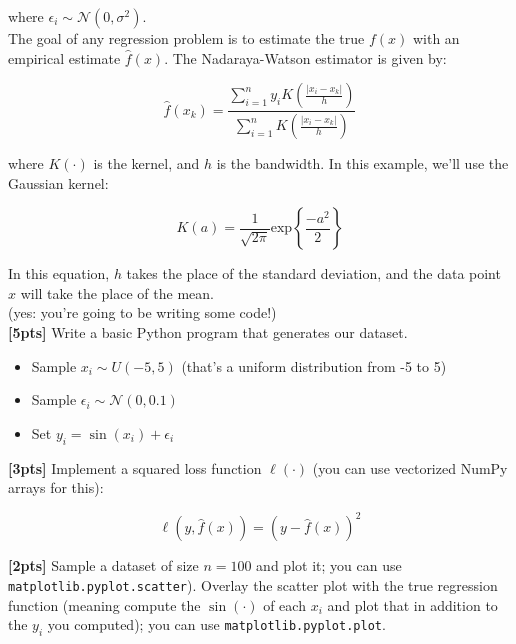 \documentclass[paper=a4, fontsize=11pt]{scrartcl} %
\numberwithin{figure}{section} %
\numberwithin{table}{section} %
\begin{document}
where $\epsilon_i \sim \mathcal{N}(0, \sigma^2)$. \\

The goal of any regression problem is to estimate the true $f(x)$ with an empirical estimate $\hat{f}(x)$. The Nadaraya-Watson estimator is given by:

$$
\hat{f}(x_k) = \frac{\sum_{i = 1}^n y_i K\left( \frac{|x_i - x_k|}{h} \right)}{\sum_{i = 1}^n K \left( \frac{|x_i - x_k|}{h} \right)}
$$

where $K(\cdot)$ is the kernel, and $h$ is the bandwidth. In this example, we'll use the Gaussian kernel:

$$
K(a) = \frac{1}{\sqrt{2 \pi}}  \textrm{exp} \left\{ \frac{-a^2}{2} \right\}
$$

In this equation, $h$ takes the place of the standard deviation, and the data point $x$ will take the place of the mean. \\

(yes: you're going to be writing some code!) \\

\textbf{[5pts]} Write a basic Python program that generates our dataset.

\begin{itemize}
	\item Sample $x_i \sim U(-5, 5)$ (that's a uniform distribution from -5 to 5)
	\item Sample $\epsilon_i \sim \mathcal{N}(0, 0.1)$
	\item Set $y_i = \sin(x_i) + \epsilon_i$
\end{itemize}

\textbf{[3pts]} Implement a squared loss function $\ell(\cdot)$ (you can use vectorized NumPy arrays for this):

$$
\ell(y, \hat{f}(x)) = (y - \hat{f}(x))^2
$$

\textbf{[2pts]} Sample a dataset of size $n = 100$ and plot it; you can use \texttt{matplotlib.pyplot.scatter}). Overlay the scatter plot with the true regression function (meaning compute the $\sin(\cdot)$ of each $x_i$ and plot that in addition to the $y_i$ you computed); you can use \texttt{matplotlib.pyplot.plot}. \\
\end{document}
